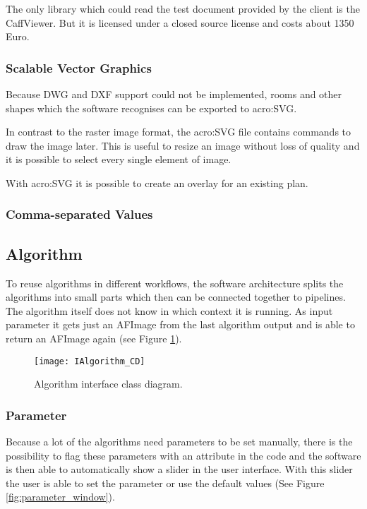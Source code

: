 The only library which could read the test document provided by the client is the CaffViewer. But it is licensed under a closed source license and costs about 1350 Euro.

\subsubsection{Scalable Vector Graphics}
Because DWG and DXF support could not be implemented, rooms and other shapes which the software recognises can be exported to \gls{acro:SVG}.

In contrast to the raster image format, the \gls{acro:SVG} file contains commands to draw the image later. This is useful to resize an image without loss of quality and it is possible to select every single element of image.

With \gls{acro:SVG} it is possible to create an overlay for an existing plan.

\subsubsection{Comma-separated Values}

\subsection{Algorithm}
To reuse algorithms in different workflows, the software architecture splits the algorithms into small parts which then can be connected together to pipelines. The algorithm itself does not know in which context it is running. As input parameter it gets just an AFImage from the last algorithm output and is able to return an AFImage again (see Figure \ref{fig:IAlgorithm_CD}). 

\begin{figure}[h]
  \centering
      \texttt{[image: IAlgorithm\_CD]}
  \caption{Algorithm interface class diagram.}
  \label{fig:IAlgorithm_CD}
\end{figure}

\subsubsection{Parameter}
Because a lot of the algorithms need parameters to be set manually, there is the possibility to flag these parameters with an attribute in the code and the software is then able to automatically show a slider in the user interface. With this slider the user is able to set the parameter or use the default values (See Figure \ref{fig:parameter_window}).


